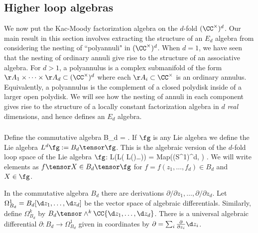 
\subsection{Higher loop algebras}
We now put the Kac-Moody factorization algebra on the $d$-fold $(\CC^\times)^d$. Our main result in this section involves extracting the structure of an $E_d$ algebra from considering the nesting of ``polyannuli" in $(\CC^\times)^d$. When $d=1$, we have seen that the nesting of ordinary annuli give rise to the structure of an associative algebra. For $d > 1$, a polyannulus is a complex submanifold of the form $\AA_1 \times \cdots \times \AA_d \subset (\CC^\times)^d$ where each $\AA_i \subset \CC^\times$ is an ordinary annulus. Equivalently, a polyannulus is the complement of a closed polydisk inside of a larger open polydisk. We will see how the nesting of annuli in each component gives rise to the structure of a locally constant factorization algebra in $d$ {\em real} dimensions, and hence defines an $E_d$ algebra. 

\subsubsection{}

Define the commutative algebra 
\ben
B_d = \CC[z_1,z_1^{-1}] \tensor \cdots \tensor \CC[z_d,z_d^{-1}] . 
\een 
If $\fg$ is any Lie algebra we define the Lie algebra $L^d \fg := B_d \tensor \fg$. This is the algebraic version of the $d$-fold loop space of the Lie algebra $\fg$:
\ben
L(L( \cdots L(\fg)\ldots)) = {\rm Map}((S^1)^{\times d}, \fg) .
\een
We will write elements as $f \tensor X \in B_d \tensor \fg$ for $f = f(z_1,\ldots,f_d) \in B_d$ and $X \in \fg$. 

In the commutative algebra $B_d$ there are derivations $\partial / \partial z_1, \ldots, \partial / \partial z_d$. Let $\Omega^1_{B_d} = B_d [\d z_1,\ldots, \d z_d]$ be the vector space of algebraic differentials. Similarly, define $\Omega^k_{B_d}$ by $B_d \tensor \wedge^k \CC \{\d z_1,\ldots, \d z_d\}$. There is a universal algebraic differential $\partial : B_d \to \Omega^1_{B_d}$ given in coordinates by $\partial = \sum_i \frac{\partial}{\partial z_i} \d z_i$. 

